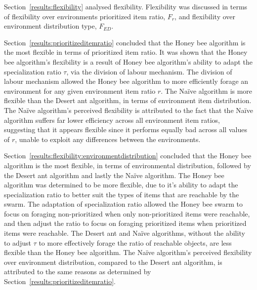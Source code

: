 Section~\ref{results:flexibility} analysed flexibility. Flexibility was discussed in terms of flexibility over environments prioritized item ratio, $F_r$, and flexibility over environment distribution type, $F_{ED}$. 

Section~\ref{results:prioritizeditemratio} concluded that the Honey bee algorithm is the most flexible in terms of prioritized item ratio. It was shown that the Honey bee algorithm's flexibility is a result of Honey bee algorithm's ability to adapt the specialization ratio $\tau$, via the division of labour mechanism. The division of labour mechanism allowed the Honey bee algorithm to more efficiently forage an environment for any given environment item ratio $r$. The Na\"ive algorithm is more flexible than the Desert ant algorithm, in terms of environment item distribution. The Na\"ive algorithm's perceived flexibility is attributed to the fact that the Na\"ive algorithm suffers far lower efficiency across all environment item ratios, suggesting that it appears flexible since it performs equally bad across all values of $r$, unable to exploit any differences between the environments. 

Section~\ref{results:flexibility:environmentdistribution} concluded that the Honey bee algorithm is the most flexible, in terms of environmental distribution, followed by the Desert ant algorithm and lastly the Na\"ive algorithm. The Honey bee algorithm was determined to be more flexible, due to it's ability to adapt the specialization ratio to better suit the types of items that are reachable by the swarm. The adaptation of specialization ratio allowed the Honey bee swarm to focus on foraging non-prioritized when only non-prioritized items were reachable, and then adjust the ratio to focus on foraging prioritized items when prioritized items were reachable. The Desert ant and Na\"ive algorithms, without the ability to adjust $\tau$ to more effectively forage the ratio of reachable objects, are less flexible than the Honey bee algorithm.
  The Na\"ive algorithm's perceived flexibility over environment distribution, compared to the Desert ant algorithm, is attributed to the same reasons as determined by Section~\ref{results:prioritizeditemratio}. 
  
